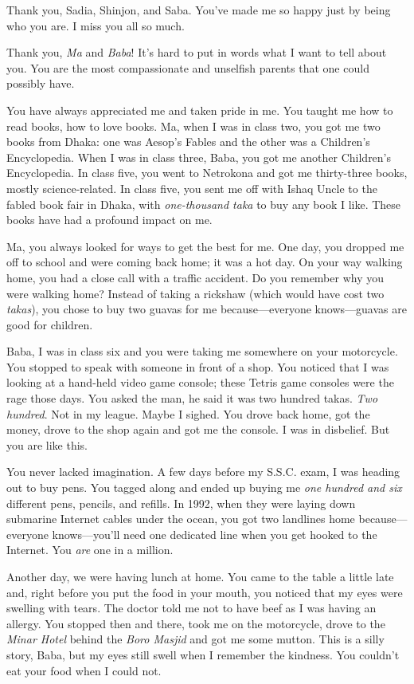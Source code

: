  \AckBreak
 Thank you, Sadia, Shinjon, and Saba. You've made me so happy just by being who you are. 
 I miss you all so much.


 Thank you, \emph{Ma} and \emph{Baba}! 
 It's hard to put in words what I want to tell about you. 
 You are the most compassionate and unselfish parents that one could possibly have. 


 You have always appreciated me and 
 taken pride in me.  
 You taught me how to read books, how to love books. 
 Ma, when I was in class two, you got me two books from Dhaka: 
 one was Aesop's Fables and the other was a Children's Encyclopedia. 
 When I was in class three, Baba, you got me another Children's Encyclopedia.
 In class five, you went to Netrokona and got me thirty-three books, 
 mostly science-related. 
 In class five, you sent me off with Ishaq Uncle to the fabled book fair in Dhaka, 
 with \emph{one-thousand taka} to buy any book I like. 
 These books have had a profound impact on me. 

 Ma, you always looked for ways to get the best for me. 
 One day, you dropped me off to school and were coming back home; 
 it was a hot day. 
 On your way walking home, you had a close call with a traffic accident. 
 Do you remember why you were walking home? 
 Instead of taking a rickshaw (which would have cost two \emph{takas}), 
 you chose to buy two guavas for me because---everyone knows---guavas are good for children.

 Baba, I was in class six and you were taking me somewhere on your motorcycle. 
 You stopped to speak with someone in front of a shop. 
 You noticed that I was looking at a hand-held video game console; 
 these Tetris game consoles were the rage those days. 
 You asked the man, he said it was two hundred takas. 
 \emph{Two hundred}. Not in my league. Maybe I sighed. 
 You drove back home, got the money, drove to the shop again 
 and got me the console. I was in disbelief. 
 But you are like this. 

 You never lacked imagination. 
 A few days before my S.S.C. exam, I was heading out to buy pens. 
 You tagged along and ended up buying me \emph{one hundred and six} 
 different pens, pencils, and refills. 
 In 1992, when they were laying down submarine Internet cables under the ocean, 
 you got two landlines home because---everyone knows---you'll need one dedicated line 
 when you get hooked to the Internet. 
 You \emph{are} one in a million.

 Another day, we were having lunch at home. 
 You came to the table a little late and, 
 right before you put the food in your mouth, 
 you noticed that my eyes were swelling with tears. 
 The doctor told me not to have beef as I was having an allergy. 
 You stopped then and there, took me on the motorcycle, 
 drove to the \emph{Minar Hotel} behind the \emph{Boro Masjid} 
 and got me some mutton. 
 This is a silly story, Baba, 
 but my eyes still swell when I remember the kindness. 
 You couldn't eat your food when I could not.

